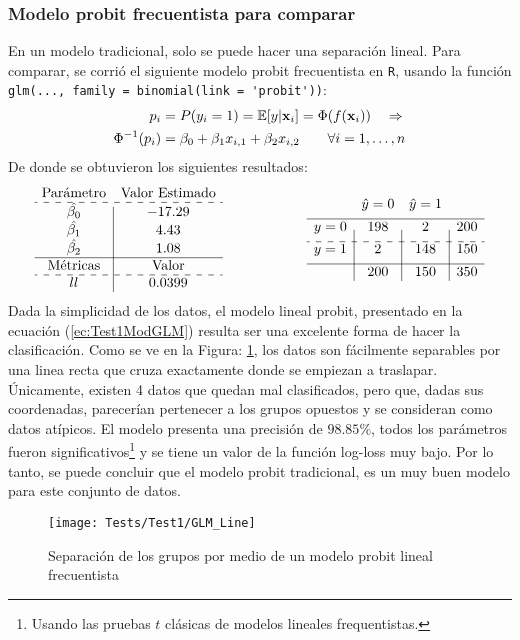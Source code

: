 \documentclass[../Main/Main.tex]{subfiles}
\begin{document}
\subsubsection*{Modelo probit frecuentista para comparar}
En un modelo tradicional, solo se puede hacer una separación lineal. Para comparar, se corrió el siguiente modelo probit frecuentista en \verb|R|, usando la función \verb|glm(..., family = binomial(link = 'probit'))|:
\begin{align}
	p_i & = P(y_i = 1) =\mathbb{E}[y|\mathbf{x}_i] = \Phi(f(\mathbf{x}_i))  \quad \Rightarrow  			\nonumber \\
	\Phi^{-1}(p_i) &= \beta_0 + \beta_1x_{i,1} + \beta_2x_{i,2} 
	\qquad 	\forall i =1,\ldots,n \label{ec:Test1ModGLM}
\end{align}
De donde se obtuvieron los siguientes resultados:
\begin{align*}
\begin{array}{c|c}
\text{Parámetro} &\text{Valor Estimado} \\
\hdashline
\hat{\beta_0} & -17.29 \\
\hat{\beta_1} & 4.43 \\
\hat{\beta_2} & 1.08 \\
\hline
\text{Métricas} & \text{Valor} \\
\hdashline
ll & 0.0399
\end{array}
\qquad\qquad\qquad
\matconf{198}{2}{200}{2}{148}{150}{200}{150}{350}
\end{align*}
Dada la simplicidad de los datos, el modelo lineal probit, presentado en la ecuación (\ref{ec:Test1ModGLM}) resulta ser una excelente forma de hacer la clasificación. Como se ve en la Figura: \ref{fig:Test1ModGLM}, los datos son fácilmente separables por una linea recta que cruza exactamente donde se empiezan a traslapar. Únicamente, existen 4 datos que quedan mal clasificados, pero que, dadas sus coordenadas, parecerían pertenecer a los grupos opuestos y se consideran como datos atípicos. El modelo presenta una precisión de $98.85\%$, todos los parámetros fueron significativos\footnote{Usando las pruebas $t$ clásicas de modelos lineales frequentistas.} y se tiene un valor de la función log-loss muy bajo. Por lo tanto, se puede concluir que el modelo probit tradicional, es un muy buen modelo para este conjunto de datos. 
\begin{figure}[h]
  \centering
      \texttt{[image: Tests/Test1/GLM\_Line]}
  \caption{Separación de los grupos por medio de un modelo probit lineal frecuentista}
 \label{fig:Test1ModGLM}
\end{figure}
\end{document}
